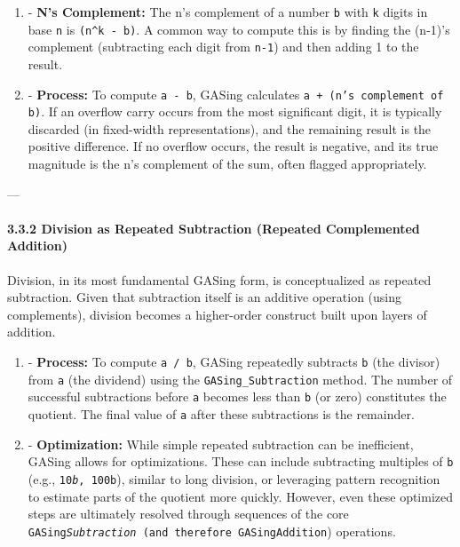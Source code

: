 \begin{enumerate}
  \item - \textbf{N's Complement:} The n's complement of a number \texttt{b} with \texttt{k} digits in base \texttt{n} is \texttt{(n^k - b)}. A common way to compute this is by finding the (n-1)'s complement (subtracting each digit from \texttt{n-1}) and then adding 1 to the result.
  \item - \textbf{Process:} To compute \texttt{a - b}, GASing calculates \texttt{a + (n's complement of b)}. If an overflow carry occurs from the most significant digit, it is typically discarded (in fixed-width representations), and the remaining result is the positive difference. If no overflow occurs, the result is negative, and its true magnitude is the n's complement of the sum, often flagged appropriately.
\end{enumerate}



---

\paragraph{3.3.2 Division as Repeated Subtraction (Repeated Complemented Addition)}
Division, in its most fundamental GASing form, is conceptualized as repeated subtraction. Given that subtraction itself is an additive operation (using complements), division becomes a higher-order construct built upon layers of addition.

\begin{enumerate}
  \item - \textbf{Process:} To compute \texttt{a / b}, GASing repeatedly subtracts \texttt{b} (the divisor) from \texttt{a} (the dividend) using the \texttt{GASing_Subtraction} method. The number of successful subtractions before \texttt{a} becomes less than \texttt{b} (or zero) constitutes the quotient. The final value of \texttt{a} after these subtractions is the remainder.
  \item - \textbf{Optimization:} While simple repeated subtraction can be inefficient, GASing allows for optimizations. These can include subtracting multiples of \texttt{b} (e.g., \texttt{10\emph{b}, \texttt{100}b}), similar to long division, or leveraging pattern recognition to estimate parts of the quotient more quickly. However, even these optimized steps are ultimately resolved through sequences of the core \texttt{GASing\emph{Subtraction} (and therefore \texttt{GASing}Addition}) operations.
\end{enumerate}

